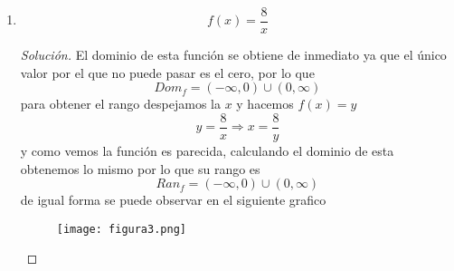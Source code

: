 \documentclass[12pt]{article}
\newenvironment{solution}{\begin{proof}[Solución]}{\end{proof}}
\begin{document}
\begin{enumerate}
\begin{solution}
    \end{solution}
    \item \[f(x) = \frac{8}{x}\]\begin{solution}
        El dominio de esta función se obtiene de inmediato ya que el único valor por el que no puede pasar es el cero, por lo que
        \[Dom_f = (-\infty,0) \cup (0, \infty)\]
        para obtener el rango despejamos la $x$ y hacemos $f(x) = y$
        \[y = \frac{8}{x} \Rightarrow x = \frac{8}{y}\]
        y como vemos la función es parecida, calculando el dominio de esta obtenemos lo mismo por lo que su rango es
        \[Ran_f = (-\infty,0) \cup (0, \infty)\]
        de igual forma se puede observar en el siguiente grafico
        \begin{figure}[H]
            \centering
            \texttt{[image: figura3.png]}
        \end{figure}
    \end{solution}
\end{enumerate}

\end{document}
